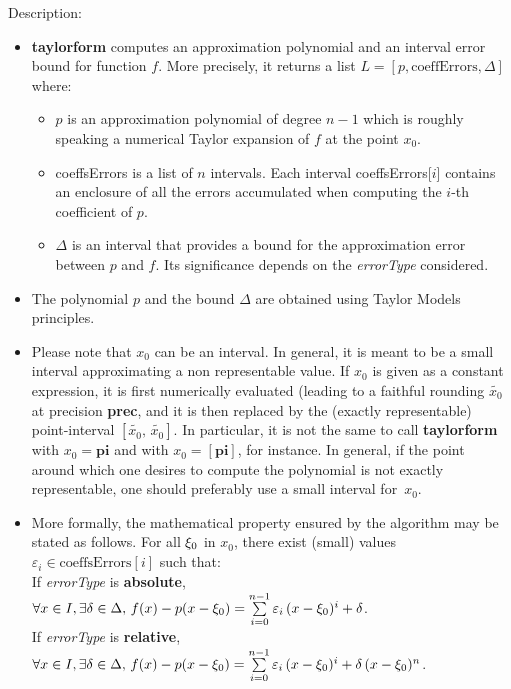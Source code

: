 \noindent Description: \begin{itemize}

\item \textbf{taylorform} computes an approximation polynomial and an interval error bound for function $f$. More precisely, it 
   returns a list $L = \left[p, \textrm{coeffErrors}, \Delta \right]$ where:
   \begin{itemize}
   \item $p$ is an approximation polynomial of degree $n-1$ which is roughly speaking a numerical Taylor expansion of $f$ at the point $x_0$.
   \item coeffsErrors is a list of $n$ intervals. Each interval coeffsErrors[$i$] contains an enclosure of all the errors accumulated when computing the $i$-th coefficient of $p$.
   \item $\Delta$ is an interval that provides a bound for the approximation error between $p$ and $f$. Its significance depends on the \emph{errorType} considered.
   \end{itemize}

\item The polynomial $p$ and the bound  $\Delta$ are obtained using Taylor Models principles.

\item Please note that $x_0$ can be an interval. In general, it is meant to be a small interval approximating a non representable value. If $x_0$ is given as a constant expression, it is first numerically evaluated (leading to a faithful rounding $\tilde{x_0}$ at precision \textbf{prec}, and it is then replaced by the (exactly representable) point-interval $[\tilde{x_0},\,\tilde{x_0}]$. In particular, it is not the same to call \textbf{taylorform} with $x_0 = \textbf{pi}$ and with $x_0 = [\textbf{pi}]$, for instance. In general, if the point around which one desires to compute the polynomial is not exactly representable, one should preferably use a small interval for~$x_0$.

\item More formally, the mathematical property ensured by the algorithm may be stated as follows. For all $\xi_0$ in $x_0$, there exist (small) values $\varepsilon_i \in \textrm{coeffsErrors}[i]$ such that:
   \\
   If \emph{errorType} is \textbf{absolute}, $\forall x \in I, \exists \delta \in \Delta,\, f(x)-p(x-\xi_0) = \sum\limits_{i=0}^{n-1} \varepsilon_i\, (x-\xi_0)^i + \delta$.
   \\
   If \emph{errorType} is \textbf{relative}, $\forall x \in I, \exists \delta \in \Delta,\, f(x)-p(x-\xi_0) = \sum\limits_{i=0}^{n-1} \varepsilon_i\, (x-\xi_0)^i + \delta\,(x-\xi_0)^n$.


\end{itemize}
